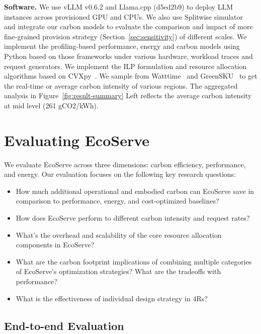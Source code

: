 \textbf{Software.} We use vLLM v0.6.2 and Llama.cpp (d5ed2b9) to deploy LLM instances across provisioned GPU and CPUs. We also use Splitwise simulator~\cite{patel2023splitwise} and integrate our carbon models to evaluate the comparison and impact of more fine-grained provision strategy (Section~\ref{sec:sensitivity}) of different scales. We implement the profiling-based performance, energy and carbon models using Python based on those frameworks under various hardware, workload traces and request generators. We implement the ILP formulation and resource allocation algorithms based on CVXpy~\cite{cvxpy}. We sample from Watttime~\cite{watttime} and GreenSKU~\cite{greensku} to get the real-time or average carbon intensity of various regions. The aggregated analysis in Figure~\ref{fig:result-summary} Left reflects  the average carbon intensity at mid level (261 gCO2/kWh). %



\section{Evaluating EcoServe}


We evaluate EcoServe across three dimensions: carbon efficiency, performance, and energy. Our evaluation focuses on the following key research questions:

\begin{itemize}[leftmargin=*]
    \item How much additional operational and embodied carbon can EcoServe save in comparison to performance, energy, and cost-optimized baselines?
    \item How does EcoServe perform to different carbon intensity and request rates?
    \item What's the overhead and scalability of the core resource allocation components in EcoServe?

    \item What are the carbon footprint implications of combining multiple categories of EcoServe's optimization strategies? What are the tradeoffs with performance? 
    \item What is the effectiveness of individual design strategy in 4Rs?
\end{itemize}
\subsection{End-to-end Evaluation}


